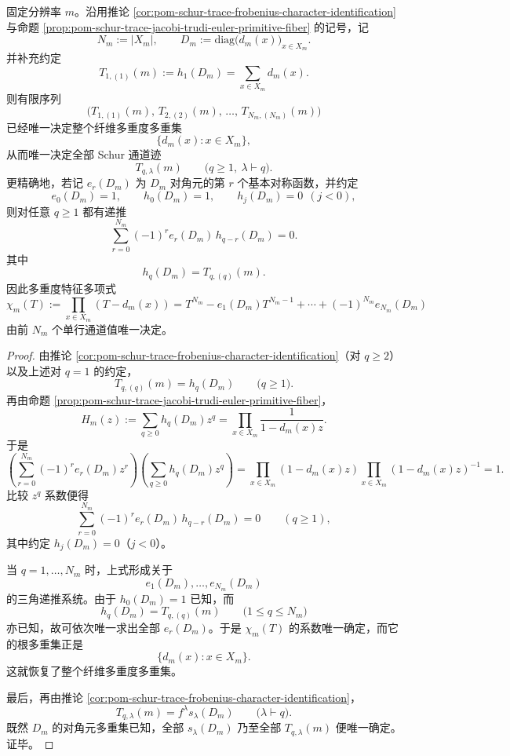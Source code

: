 \begin{theorem}\label{thm:conclusion-schur-single-row-complete-recovery}
固定分辨率 \(m\)。沿用推论 \ref{cor:pom-schur-trace-frobenius-character-identification} 与命题 \ref{prop:pom-schur-trace-jacobi-trudi-euler-primitive-fiber} 的记号，记
\[
N_m:=|X_m|,
\qquad
D_m:=\mathrm{diag}\bigl(d_m(x)\bigr)_{x\in X_m}.
\]
并补充约定
\[
T_{1,(1)}(m):=h_1(D_m)=\sum_{x\in X_m}d_m(x).
\]
则有限序列
\[
\bigl(
T_{1,(1)}(m),\,
T_{2,(2)}(m),\,
\dots,\,
T_{N_m,(N_m)}(m)
\bigr)
\]
已经唯一决定整个纤维多重度多重集
\[
\{d_m(x):x\in X_m\},
\]
从而唯一决定全部 Schur 通道迹
\[
T_{q,\lambda}(m)
\qquad
\bigl(q\ge 1,\ \lambda\vdash q\bigr).
\]
更精确地，若记 \(e_r(D_m)\) 为 \(D_m\) 对角元的第 \(r\) 个基本对称函数，并约定
\[
e_0(D_m)=1,
\qquad
h_0(D_m)=1,
\qquad
h_j(D_m)=0\ \ (j<0),
\]
则对任意 \(q\ge 1\) 都有递推
\[
\boxed{\;
\sum_{r=0}^{N_m}
(-1)^r e_r(D_m)\,h_{q-r}(D_m)=0.\;}
\]
其中
\[
h_q(D_m)=T_{q,(q)}(m).
\]
因此多重度特征多项式
\[
\chi_m(T):=\prod_{x\in X_m}(T-d_m(x))
=
T^{N_m}-e_1(D_m)T^{N_m-1}+\cdots+(-1)^{N_m}e_{N_m}(D_m)
\]
由前 \(N_m\) 个单行通道值唯一决定。
\end{theorem}
\begin{proof}
由推论 \ref{cor:pom-schur-trace-frobenius-character-identification}（对 \(q\ge 2\)）以及上述对 \(q=1\) 的约定，
\[
T_{q,(q)}(m)=h_q(D_m)
\qquad
\bigl(q\ge 1\bigr).
\]
再由命题 \ref{prop:pom-schur-trace-jacobi-trudi-euler-primitive-fiber}，
\[
H_m(z):=\sum_{q\ge 0}h_q(D_m)z^q
=
\prod_{x\in X_m}\frac{1}{1-d_m(x)z}.
\]
于是
\[
\left(
\sum_{r=0}^{N_m}(-1)^r e_r(D_m)z^r
\right)
\left(
\sum_{q\ge 0}h_q(D_m)z^q
\right)
=
\prod_{x\in X_m}(1-d_m(x)z)\prod_{x\in X_m}(1-d_m(x)z)^{-1}
=
1.
\]
比较 \(z^q\) 系数便得
\[
\sum_{r=0}^{N_m}(-1)^r e_r(D_m)\,h_{q-r}(D_m)=0
\qquad(q\ge 1),
\]
其中约定 \(h_j(D_m)=0\)（\(j<0\)）。

当 \(q=1,\dots,N_m\) 时，上式形成关于
\[
e_1(D_m),\dots,e_{N_m}(D_m)
\]
的三角递推系统。由于 \(h_0(D_m)=1\) 已知，而
\[
h_q(D_m)=T_{q,(q)}(m)
\qquad
\bigl(1\le q\le N_m\bigr)
\]
亦已知，故可依次唯一求出全部 \(e_r(D_m)\)。于是 \(\chi_m(T)\) 的系数唯一确定，而它的根多重集正是
\[
\{d_m(x):x\in X_m\}.
\]
这就恢复了整个纤维多重度多重集。

最后，再由推论 \ref{cor:pom-schur-trace-frobenius-character-identification}，
\[
T_{q,\lambda}(m)=f^\lambda s_\lambda(D_m)
\qquad
\bigl(\lambda\vdash q\bigr).
\]
既然 \(D_m\) 的对角元多重集已知，全部 \(s_\lambda(D_m)\) 乃至全部 \(T_{q,\lambda}(m)\) 便唯一确定。证毕。
\end{proof}

